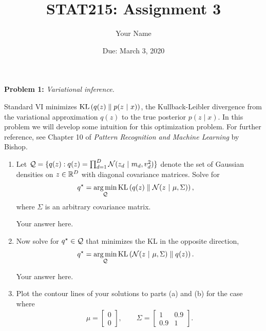 \documentclass[11pt]{article}
\title{STAT215: Assignment 3}
\author{Your Name}
\date{Due: March 3, 2020}
\begin{document}
\maketitle

\textbf{Problem 1:} \textit{Variational inference.} 

Standard VI minimizes $\textrm{KL}\left(q(z)\;\|\;p(z ~\vert~ x)\right)$, the Kullback-Leibler divergence from the variational approximation $q(z)$ to the true posterior $p(z \mid x)$.  In this problem we will develop some intuition for this optimization problem.  For further reference, see Chapter 10 of \textit{Pattern Recognition and Machine Learning} by Bishop.

\begin{enumerate}[label=(\alph*)]
    \item Let $\mathcal{Q} = \{q(z): q(z) = \prod_{d=1}^D \mathcal{N}(z_d ~\vert~ m_d, v_d^2)\}$ denote the set of Gaussian densities on $z \in \mathbb{R}^D$ with diagonal covariance matrices.  Solve for 
    \begin{align*}
        q^\star &= \operatorname*{arg\,min}_{\mathcal{Q}} \textrm{KL}\left(q(z)\;\|\;\mathcal{N}(z ~\vert~ \mu, \Sigma)\right),
    \end{align*}
    where $\Sigma$ is an arbitrary covariance matrix.
    
    \begin{solution}
    Your answer here.
    \end{solution}
    
    \item Now solve for $q^\star \in \mathcal{Q}$ that minimizes the KL in the opposite direction,
    \begin{align*}
        q^\star &= \operatorname*{arg\,min}_{\mathcal{Q}} \textrm{KL}\left(\mathcal{N}(z ~\vert~ \mu, \Sigma)\;\|\;q(z)\right).
    \end{align*}
    
    \begin{solution}
    Your answer here.
    \end{solution}
    
    \item Plot the contour lines of your solutions to parts (a) and (b) for the case where
    \begin{align*}
        \mu = \begin{bmatrix}0 \\ 0 \end{bmatrix}, \qquad
        \Sigma = \begin{bmatrix} 1 & 0.9 \\ 0.9 & 1 \end{bmatrix}.
    \end{align*}

\end{enumerate}
\end{document}
